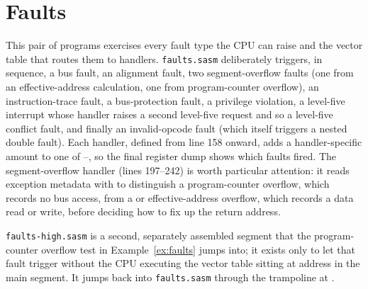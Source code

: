 \label{ex:byte-sieve}


\section{Faults}

This pair of programs exercises every fault type the CPU can raise and the vector table that routes them to handlers.
\texttt{faults.sasm} deliberately triggers, in sequence, a bus fault, an alignment fault, two segment-overflow faults
(one from an effective-address calculation, one from program-counter overflow), an instruction-trace fault, a
bus-protection fault, a privilege violation, a level-five interrupt whose handler raises a second level-five request
and so a level-five conflict fault, and finally an invalid-opcode fault (which itself triggers a nested double fault).
Each handler, defined from line 158 onward, adds a handler-specific amount to one of --, so the final
register dump shows which faults fired. The segment-overflow handler (lines 197--242) is worth particular attention: it
reads exception metadata with  to distinguish a program-counter overflow, which records no bus access,
from a  or  effective-address overflow, which records a data read or write, before
deciding how to fix up the return address.

\label{ex:faults}


\texttt{faults-high.sasm} is a second, separately assembled segment that the program-counter
overflow test in Example~\ref{ex:faults} jumps into; it exists only to let that fault trigger
without the CPU executing the vector table sitting at address  in the main segment. It
jumps back into \texttt{faults.sasm} through the trampoline at .


